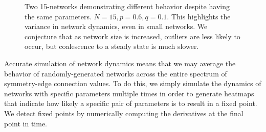 \documentclass[psamsfonts]{amsart}
\theoremstyle{definition}
\theoremstyle{remark}
\numberwithin{equation}{section}
\begin{document}
\begin{figure}[h]
\begin{subfigure}{0.45\textwidth}
         \label{fig:1b}
     \end{subfigure}
     \caption{Two 15-networks demonstrating different behavior despite having the same parameters. $N=15, p=0.6, q=0.1$. This highlights the variance in network dynamics, even in small networks. We conjecture that as network size is increased, outliers are less likely to occur, but coalescence to a steady state is much slower.}
     \label{fig:1}
\end{figure}

Accurate simulation of network dynamics means that we may average the behavior of randomly-generated networks across the entire spectrum of symmetry-edge connection values. To do this, we simply simulate the dynamics of networks with specific parameters multiple times in order to generate heatmaps that indicate how likely a specific pair of parameters is to result in a fixed point. We detect fixed points by numerically computing the derivatives at the final point in time.
\end{document}
